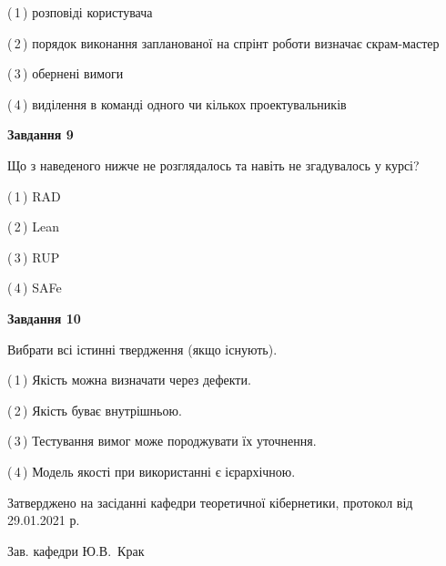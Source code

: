 \documentclass[10pt, ukrainian]{article}
\begin{document}
{\begin {large}
(\,1\,) розповіді користувача%



(\,2\,) порядок виконання запланованої на спрінт роботи визначає скрам-мастер%



(\,3\,) обернені вимоги%



(\,4\,) виділення в команді одного чи кількох проектувальників%


{\begin {center}\textbf{Завдання 9}\end {center}}\par
Що з наведеного нижче не розглядалось та навіть не згадувалось у курсі?\par
\vspace{2mm}



(\,1\,) RAD%



(\,2\,) Lean%



(\,3\,) RUP%



(\,4\,) SAFe%


{\begin {center}\textbf{Завдання 10}\end {center}}\par
Вибрати всі істинні твердження (якщо існують).\par
\vspace{2mm}



(\,1\,) Якість можна визначати через дефекти.%



(\,2\,) Якість буває внутрішньою.%



(\,3\,) Тестування вимог може породжувати їх уточнення.%



(\,4\,) Модель якості при використанні є ієрархічною.%



\end {large}}
{\vspace{5mm}\smallskip \begin {small} Затверджено на засіданні кафедри теоретичної кібернетики, протокол  від   29.01.2021 р.\par\smallskip\smallskip
{\parbox {6.5 cm}{Зав. кафедри \dotfill Ю.В.~Крак}} \end{small}}
\newpage
\end{document}
